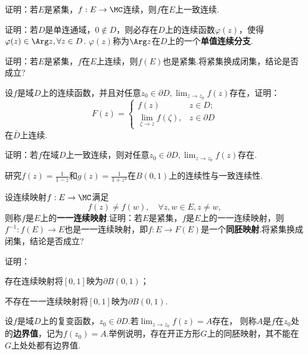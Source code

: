 \begin{xiti}\hypertarget{xiti1.7}{}
\item 证明：若$E$是紧集，$f:E\to\MC$连续，则$f$在$E$上一致连续.
\item 证明：若$D$是单连通域，$0\notin D$，则必存在$D$上的连续函数$\varphi(z)$，使得$\varphi(z)\in \Arg z,\forall z\in D$. $\varphi(z)$称为$\Arg z$在$D$上的一个\textbf{单值连续分支}.
\item 证明：若$E$是紧集，$f$在$E$上连续，则$f(E)$也是紧集.将紧集换成闭集，结论是否成立?
\item 设$f$是域$D$上的连续函数，并且对任意$z_0\in\partial D,\lim_{z\to z_0}f(z)$存在，证明：
\[F(z)=\begin{cases}
f(z)&z\in D;\\
\lim_{\zeta\to z}f(\zeta),&z\in \partial D
\end{cases}\]
在$\bar D$上连续.
\item 证明：若$f$在域$D$上一致连续，则对任意$z_0\in\partial D,\lim_{z\to z_0}f(z)$存在.
\item 研究$f(z)=\frac1{1-z}$和$g(z)=\frac1{1+z^2}$在$B(0,1)$上的连续性与一致连续性.
\item \hypertarget{xiti1.7.7}{} 设连续映射$f:E\to\MC$满足
  \[f(z)\ne f(w),\quad \forall z,w\in E,z\ne w,\]
则称$f$是$E$上的\textbf{一一连续映射}.证明：若$E$是紧集，$f$是$E$上的一一连续映射，则$f^{-1}:f(E)\to E$也是一一连续映射，即$f:E\to F(E)$是一个\textbf{同胚映射}.将紧集换成闭集，结论是否成立?
\item 证明：
\begin{enuma}
  \item 存在连续映射将$[0,1]$映为$\partial B(0,1)$；
  \item 不存在一一连续映射将$[0,1]$映为$\partial B(0,1)$.
\end{enuma}
\item 设$f$是域$D$上的复变函数，$z_0\in\partial D$.若$\lim_{z\to z_0}f(z)=A$存在，
则称$A$是$f$在$z_0$处的\textbf{边界值}，记为$f(z_0)=A$.举例说明，存在开正方形$G$上的同胚映射，其不能在$G$上处处都有边界值.
\end{xiti}
